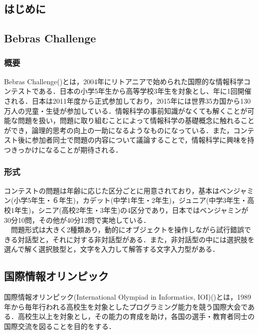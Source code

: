 \documentclass[a4paper]{jarticle}
\begin{document}
\maketitle
\begin{multicols}{2}
\setcounter{page}{1}

\section{はじめに}

\subsection{Bebras Challenge}
\subsubsection{概要}
Bebras Challenge(\cite{bebras-contest, bebras-pdf})とは，2004年にリトアニアで始められた国際的な情報科学コンテストである．日本の小学5年生から高等学校3年生を対象とし、年に1回開催される．日本は2011年度から正式参加しており，2015年には世界35カ国から130万人の児童・生徒が参加している．情報科学の事前知識がなくても解くことが可能な問題を扱い，問題に取り組むことによって情報科学の基礎概念に触れることができ，論理的思考の向上の一助になるようなものになっている．また，コンテスト後に参加者同士で問題の内容について議論することで，情報科学に興味を持つきっかけになることが期待される．

\subsubsection{形式}
 コンテストの問題は年齢に応じた区分ごとに用意されており，基本はベンジャミン(小学5年生・６年生)，カデット(中学1年生・2年生)，ジュニア(中学3年生・高校1年生)，シニア(高校2年生・3年生)の4区分であり，日本ではベンジャミンが30分10問，その他が40分12問で実地している．
\\　問題形式は大きく2種類あり，動的にオブジェクトを操作しながら試行錯誤できる対話型と，それに対する非対話型がある．また，非対話型の中には選択肢を選んで解く選択肢型と，文字を入力して解答する文字入力型がある．

\subsection{国際情報オリンピック}
国際情報オリンピック(International Olympiad in Informatics, IOI)(\cite{ioi})とは，1989年から毎年行われる高校生を対象としたプログラミング能力を競う国際大会である．高校生以上を対象とし，その能力の育成を助け，各国の選手・教育者同士の国際交流を図ることを目的をする．



\end{multicols}
\end{document}
